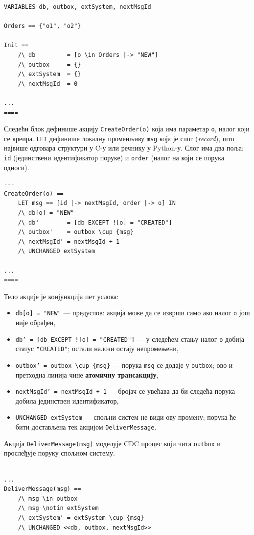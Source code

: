 \begin{primer}
\begin{lstlisting}
VARIABLES db, outbox, extSystem, nextMsgId

Orders == {"o1", "o2"}

Init ==
    /\ db         = [o \in Orders |-> "NEW"]
    /\ outbox     = {}
    /\ extSystem  = {}
    /\ nextMsgId  = 0

...
====
\end{lstlisting}

Следећи блок дефинише акцију \texttt{CreateOrder(o)} која има параметар \texttt{o}, налог који се креира.
\texttt{LET} дефинише локалну променљиву \texttt{msg} која је слог (\textit{record}), што највише одговара
структури у C-у или речнику у Python-у. Слог има два поља: \texttt{id} (јединствени идентификатор поруке)
и \texttt{order} (налог на који се порука односи).
\begin{lstlisting}
---
CreateOrder(o) ==
    LET msg == [id |-> nextMsgId, order |-> o] IN
    /\ db[o] = "NEW"
    /\ db'        = [db EXCEPT ![o] = "CREATED"]
    /\ outbox'    = outbox \cup {msg}
    /\ nextMsgId' = nextMsgId + 1
    /\ UNCHANGED extSystem

...
====
\end{lstlisting}
Тело акције је конјункција пет услова:
\begin{itemize}
    \item \texttt{db[o] = "NEW"} --- предуслов: акција може да се изврши само ако налог \texttt{o} још није обрађен,
    \item \texttt{db' = [db EXCEPT ![o] = "CREATED"]} --- у следећем стању налог \texttt{o} добија статус \texttt{"CREATED"}; остали налози остају непромењени,
    \item \texttt{outbox' = outbox \textbackslash cup \{msg\}} --- порука \texttt{msg} се додаје у \texttt{outbox}; ово и претходна линија чине \textbf{атомичну трансакцију},
    \item \texttt{nextMsgId' = nextMsgId + 1} --- бројач се увећава да би следећа порука добила јединствен идентификатор,
    \item \texttt{UNCHANGED extSystem} --- спољни систем не види ову промену; порука ће бити достављена тек акцијом \texttt{DeliverMessage}.
\end{itemize}

Акција \texttt{DeliverMessage(msg)} моделује CDC процес који чита \texttt{outbox} и прослеђује поруку спољном систему.
\begin{lstlisting}
---
...
DeliverMessage(msg) ==
    /\ msg \in outbox
    /\ msg \notin extSystem
    /\ extSystem' = extSystem \cup {msg}
    /\ UNCHANGED <<db, outbox, nextMsgId>>


\end{lstlisting}
\end{primer}
